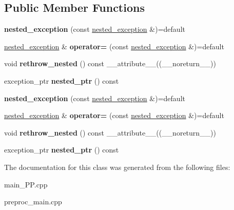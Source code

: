 \subsection*{Public Member Functions}
\begin{DoxyCompactItemize}
\item 
\hypertarget{classstd_1_1nested__exception_acf00ae5eff78ae20bcdbcb371c350a52}{{\bfseries nested\+\_\+exception} (const \hyperlink{classstd_1_1nested__exception}{nested\+\_\+exception} \&)=default}\label{classstd_1_1nested__exception_acf00ae5eff78ae20bcdbcb371c350a52}

\item 
\hypertarget{classstd_1_1nested__exception_af460a59c7138c71a0014d27435033121}{\hyperlink{classstd_1_1nested__exception}{nested\+\_\+exception} \& {\bfseries operator=} (const \hyperlink{classstd_1_1nested__exception}{nested\+\_\+exception} \&)=default}\label{classstd_1_1nested__exception_af460a59c7138c71a0014d27435033121}

\item 
\hypertarget{classstd_1_1nested__exception_a04a46b26b3b147801bbf2606700d2271}{void {\bfseries rethrow\+\_\+nested} () const \+\_\+\+\_\+attribute\+\_\+\+\_\+((\+\_\+\+\_\+noreturn\+\_\+\+\_\+))}\label{classstd_1_1nested__exception_a04a46b26b3b147801bbf2606700d2271}

\item 
\hypertarget{classstd_1_1nested__exception_a958b46f872829027faa5b154e01a2437}{exception\+\_\+ptr {\bfseries nested\+\_\+ptr} () const }\label{classstd_1_1nested__exception_a958b46f872829027faa5b154e01a2437}

\item 
\hypertarget{classstd_1_1nested__exception_acf00ae5eff78ae20bcdbcb371c350a52}{{\bfseries nested\+\_\+exception} (const \hyperlink{classstd_1_1nested__exception}{nested\+\_\+exception} \&)=default}\label{classstd_1_1nested__exception_acf00ae5eff78ae20bcdbcb371c350a52}

\item 
\hypertarget{classstd_1_1nested__exception_af460a59c7138c71a0014d27435033121}{\hyperlink{classstd_1_1nested__exception}{nested\+\_\+exception} \& {\bfseries operator=} (const \hyperlink{classstd_1_1nested__exception}{nested\+\_\+exception} \&)=default}\label{classstd_1_1nested__exception_af460a59c7138c71a0014d27435033121}

\item 
\hypertarget{classstd_1_1nested__exception_a04a46b26b3b147801bbf2606700d2271}{void {\bfseries rethrow\+\_\+nested} () const \+\_\+\+\_\+attribute\+\_\+\+\_\+((\+\_\+\+\_\+noreturn\+\_\+\+\_\+))}\label{classstd_1_1nested__exception_a04a46b26b3b147801bbf2606700d2271}

\item 
\hypertarget{classstd_1_1nested__exception_a958b46f872829027faa5b154e01a2437}{exception\+\_\+ptr {\bfseries nested\+\_\+ptr} () const }\label{classstd_1_1nested__exception_a958b46f872829027faa5b154e01a2437}

\end{DoxyCompactItemize}


The documentation for this class was generated from the following files\+:\begin{DoxyCompactItemize}
\item 
main\+\_\+\+P\+P.\+cpp\item 
preproc\+\_\+main.\+cpp\end{DoxyCompactItemize}
